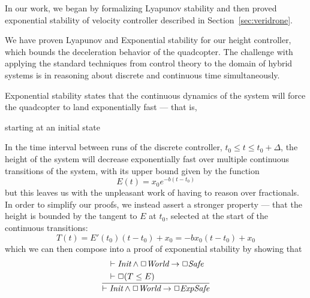 \documentclass[preprint]{sigplanconf}
\begin{document}
In our work, we began by formalizing Lyapunov stability and then proved exponential stability of velocity controller described in Section~\ref{sec:veridrone}.






We have proven Lyapunov and Exponential stability for our height controller, which bounds the deceleration behavior of the quadcopter. The challenge with applying the standard techniques from control theory to the domain of hybrid systems is in reasoning about discrete and continuous time simultaneously.




Exponential stability states that the continuous dynamics of the system will force the quadcopter to land exponentially fast --- that is,

starting at an initial state

In the time interval between runs of the discrete controller, $t_0\leq t \leq t_0+\Delta$, the height of the system will decrease exponentially fast over multiple continuous transitions of the system, with its upper bound given by the function
 \[E(t)=x_0e^{-b(t-t_0)}\]
but this leaves us with the unpleasant work of having to reason over fractionals. In order to simplify our proofs, we instead assert a stronger property --- that the height is bounded by the tangent to $E$ at $t_0$, selected at the start of the continuous transitions:
\[T(t) = E'(t_0)(t-t_0)+x_0 = -bx_0(t-t_0)+x_0\]
which we can then compose into a proof of exponential stability by showing that
\[
  \frac
  {\begin{aligned}
      & \vdash \emph{Init} \land \Box \emph{World} \rightarrow \Box \emph{Safe} \\
      & \vdash \Box (T\leq E)
    \end{aligned}}
  {\vdash \emph{Init} \land \Box \emph{World} \rightarrow \Box \emph{ExpSafe}}
\]
\end{document}
